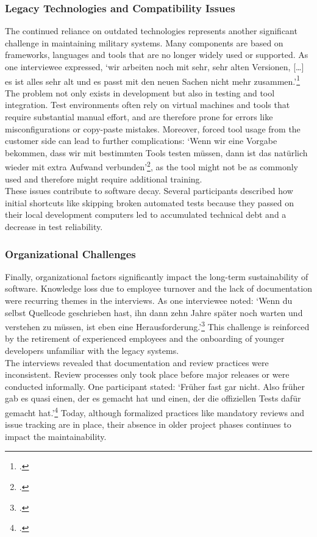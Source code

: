 \subsubsection{Legacy Technologies and Compatibility Issues}
The continued reliance on outdated technologies represents another significant challenge in maintaining military systems. Many components are based on frameworks, languages and tools that are no longer widely used or supported.
As one interviewee expressed, `wir arbeiten noch mit sehr, sehr alten Versionen, [\ldots] es ist alles sehr alt und es passt mit den neuen Sachen nicht mehr zusammen.'\footcite{interview1}\\

The problem not only exists in development but also in testing and tool integration. Test environments often rely on virtual machines and tools that require substantial manual effort, and are therefore prone for errors like misconfigurations or copy-paste mistakes.
Moreover, forced tool usage from the customer side can lead to further complications: `Wenn wir eine Vorgabe bekommen, dass wir mit bestimmten Tools testen müssen, dann ist das natürlich wieder mit extra Aufwand verbunden'\footcite{interview3}, as the tool might not be as commonly used and therefore might require additional training.\\

These issues contribute to software decay. Several participants described how initial shortcuts like skipping broken automated tests because they passed on their local development computers led to accumulated technical debt and a decrease in test reliability.\\

\subsubsection{Organizational Challenges}
Finally, organizational factors significantly impact the long-term sustainability of software. Knowledge loss due to employee turnover and the lack of documentation were recurring themes in the interviews.
As one interviewee noted: `Wenn du selbst Quellcode geschrieben hast, ihn dann zehn Jahre später noch warten und verstehen zu müssen, ist eben eine Herausforderung.'\footcite{interview2} This challenge is reinforced by the retirement of experienced employees and the onboarding of younger developers
unfamiliar with the legacy systems.\\

The interviews revealed that documentation and review practices were inconsistent. Review processes only took place before major releases or were conducted informally. One participant stated:
`Früher fast gar nicht. Also früher gab es quasi einen, der es gemacht hat und einen, der die offiziellen Tests dafür gemacht hat.'\footcite{interview1} Today, although formalized practices like mandatory reviews and issue tracking are in place, their absence in older project 
phases continues to impact the maintainability. 

